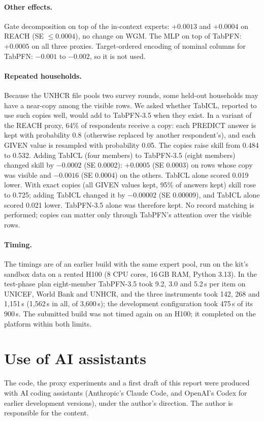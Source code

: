 \documentclass{article}
\begin{document}
\paragraph{Other effects.} Gate decomposition on top of the in-context experts: $+0.0013$ and
$+0.0004$ on REACH (SE $\le 0.0004$), no change on WGM. The MLP on top of TabPFN: $+0.0005$ on all
three proxies. Target-ordered encoding of nominal columns for TabPFN: $-0.001$ to $-0.002$, so it
is not used.

\paragraph{Repeated households.} Because the UNHCR file pools two survey rounds, some held-out
households may have a near-copy among the visible rows. We asked whether TabICL, reported to use
such copies well, would add to TabPFN-3.5 when they exist. In a variant of the REACH proxy, 64\%
of respondents receive a copy: each PREDICT answer is kept with probability 0.8 (otherwise
replaced by another respondent's), and each GIVEN value is resampled with probability 0.05. The
copies raise skill from 0.484 to 0.532. Adding TabICL (four members) to TabPFN-3.5 (eight members)
changed skill by $-0.0002$ (SE 0.0002): $+0.0005$ (SE 0.0003) on rows whose copy was visible and
$-0.0016$ (SE 0.0004) on the others. TabICL alone scored 0.019 lower. With exact copies (all GIVEN
values kept, 95\% of answers kept) skill rose to 0.725; adding TabICL changed it by $-0.00002$
(SE 0.00009), and TabICL alone scored 0.021 lower. TabPFN-3.5 alone was therefore kept. No record
matching is performed; copies can matter only through TabPFN's attention over the visible rows.

\paragraph{Timing.} The timings are of an earlier build with the same expert pool, run on the
kit's sandbox data on a rented H100 (8 CPU cores, 16\,GB RAM, Python 3.13). In the test-phase plan
eight-member TabPFN-3.5 took 9.2, 3.0 and 5.2\,s per item on UNICEF, World Bank and UNHCR, and the
three instruments took 142, 268 and 1{,}151\,s (1{,}562\,s in all, of 3{,}600\,s); the development
configuration took 475\,s of its 900\,s. The submitted build was not timed again on an H100; it
completed on the platform within both limits.

\section{Use of AI assistants}
The code, the proxy experiments and a first draft of this report were produced with AI coding
assistants (Anthropic's Claude Code, and OpenAI's Codex for earlier development versions), under
the author's direction. The author is responsible for the content.
\end{document}

